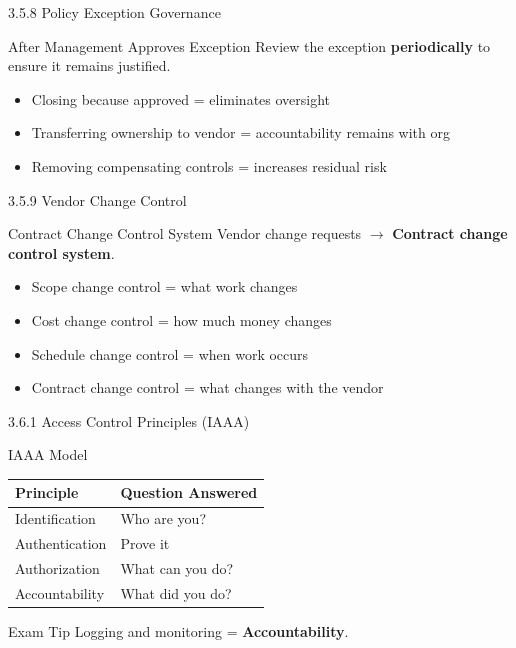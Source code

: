 \documentclass{beamer}
\begin{document}
	\begin{frame}{3.5.8 Policy Exception Governance}
		\begin{block}{After Management Approves Exception}
			Review the exception \textbf{periodically} to ensure it remains justified.
		\end{block}
		\begin{itemize}
			\item Closing because approved = eliminates oversight
			\item Transferring ownership to vendor = accountability remains with org
			\item Removing compensating controls = increases residual risk
		\end{itemize}
	\end{frame}
	
	\begin{frame}{3.5.9 Vendor Change Control}
		\begin{block}{Contract Change Control System}
			Vendor change requests $\rightarrow$ \textbf{Contract change control system}.
		\end{block}
		\begin{itemize}
			\item Scope change control = what work changes
			\item Cost change control = how much money changes
			\item Schedule change control = when work occurs
			\item Contract change control = what changes with the vendor
		\end{itemize}
	\end{frame}
	
	\begin{frame}{3.6.1 Access Control Principles (IAAA)}
		\begin{block}{IAAA Model}
			\begin{tabular}{|p{3cm}|p{8cm}|}
				\hline
				\textbf{Principle} & \textbf{Question Answered} \\
				\hline
				Identification & Who are you? \\
				\hline
				Authentication & Prove it \\
				\hline
				Authorization & What can you do? \\
				\hline
				Accountability & What did you do? \\
				\hline
			\end{tabular}
		\end{block}
		\begin{alertblock}{Exam Tip}
			Logging and monitoring = \textbf{Accountability}.
		\end{alertblock}
	\end{frame}
	
\end{document}

